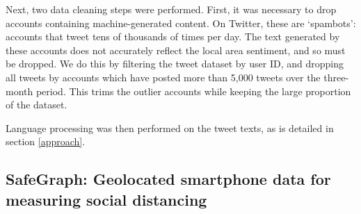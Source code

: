 \documentclass[12pt,a4]{article}
\begin{document}
Next, two data cleaning steps were performed. First, it was necessary to drop accounts containing machine-generated content. On Twitter, these are `spambots': accounts that tweet tens of thousands of times per day. The text generated by these accounts does not accurately reflect the local area sentiment, and so must be dropped. We do this by filtering the tweet dataset by user ID, and dropping all tweets by accounts which have posted more than 5,000 tweets over the three-month period. This trims the outlier accounts while keeping the large proportion of the dataset.


Language processing was then performed on the tweet texts, as is detailed in section \ref{approach}. 

\subsection{SafeGraph: Geolocated smartphone data for measuring social distancing}
\end{document}
